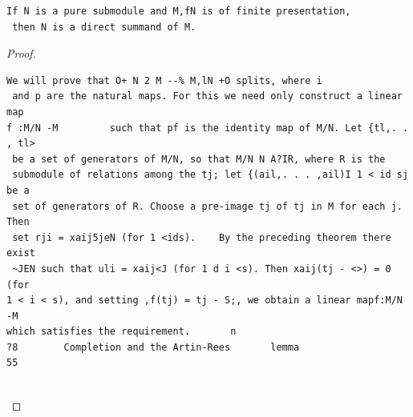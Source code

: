 \begin{theorem}\label{mcrt-auto-theorem-7-14}\uses{}
\begin{verbatim}
If N is a pure submodule and M,fN is of finite presentation,
 then N is a direct summand of M.
\end{verbatim}
\end{theorem}
\begin{proof}
\begin{verbatim}
We will prove that O+ N 2 M --% M,lN +O splits, where i
 and p are the natural maps. For this we need only construct a linear map
f :M/N -M         such that pf is the identity map of M/N. Let {tl,. . , tl>
 be a set of generators of M/N, so that M/N N A?IR, where R is the
 submodule of relations among the tj; let {(ail,. . . ,ail)I 1 < id sj be a
 set of generators of R. Choose a pre-image tj of tj in M for each j. Then
 set rji = xaij5jeN (for 1 <ids).    By the preceding theorem there exist
 ~JEN such that uli = xaij<J (for 1 d i <s). Then xaij(tj - <>) = 0 (for
1 < i < s), and setting ,f(tj) = tj - S;, we obtain a linear mapf:M/N     -M
which satisfies the requirement.       n
?8        Completion and the Artin-Rees       lemma                               55


\end{verbatim}
\end{proof}
